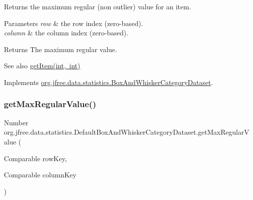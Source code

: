 Returns the maximum regular (non outlier) value for an item.


\begin{DoxyParams}{Parameters}
{\em row} & the row index (zero-\/based). \\
\hline
{\em column} & the column index (zero-\/based).\\
\hline
\end{DoxyParams}
\begin{DoxyReturn}{Returns}
The maximum regular value.
\end{DoxyReturn}
\begin{DoxySeeAlso}{See also}
\mbox{\hyperlink{classorg_1_1jfree_1_1data_1_1statistics_1_1_default_box_and_whisker_category_dataset_a85c944b06e4337059ea728b3a744e2a9}{get\+Item(int, int)}} 
\end{DoxySeeAlso}


Implements \mbox{\hyperlink{interfaceorg_1_1jfree_1_1data_1_1statistics_1_1_box_and_whisker_category_dataset_a4dc17471f39dbde635664e9040f6fd21}{org.\+jfree.\+data.\+statistics.\+Box\+And\+Whisker\+Category\+Dataset}}.

\mbox{\label{classorg_1_1jfree_1_1data_1_1statistics_1_1_default_box_and_whisker_category_dataset_acd767ade9e48d8733e4ee21a3b2ed95b}} 
\subsubsection{\texorpdfstring{get\+Max\+Regular\+Value()}{getMaxRegularValue()}\hspace{0.1cm}{\footnotesize\ttfamily [2/2]}}
{\footnotesize\ttfamily Number org.\+jfree.\+data.\+statistics.\+Default\+Box\+And\+Whisker\+Category\+Dataset.\+get\+Max\+Regular\+Value (\begin{DoxyParamCaption}\item[{Comparable}]{row\+Key,  }\item[{Comparable}]{column\+Key }\end{DoxyParamCaption})}

